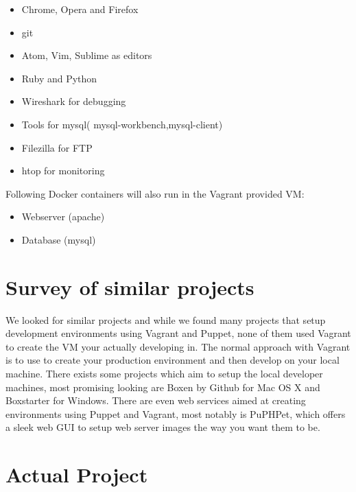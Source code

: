 \begin{itemize}
\item Chrome, Opera and Firefox
\item git
\item Atom, Vim, Sublime as editors
\item Ruby and Python
\item Wireshark for debugging
\item Tools for mysql( mysql-workbench,mysql-client)
\item Filezilla for FTP 
\item htop for monitoring
\end{itemize}
Following Docker containers will also run in the Vagrant provided \gls{VM}:
\begin{itemize}
\item Webserver (apache)
\item Database (mysql)
\end{itemize}

\section{Survey of similar projects}

We looked for similar projects and while we found many projects that setup development environments using Vagrant and Puppet, none of them used Vagrant to create the \gls{VM} your actually developing in. The normal approach with Vagrant is to use to create your production environment and then develop on your local machine. There exists some projects which aim to setup the local developer machines, most promising looking are Boxen by Github for Mac OS X and Boxstarter for Windows. 
There are even web services aimed at creating environments using Puppet and Vagrant, most notably is PuPHPet, which offers a sleek web GUI to setup web server images the way you want them to be.

\section{Actual Project}


